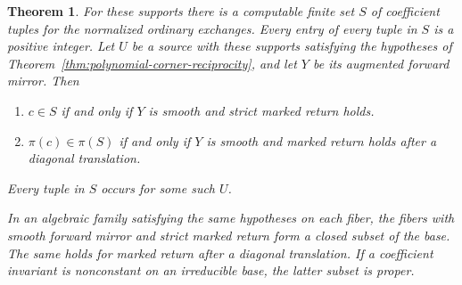 \documentclass[11pt,reqno]{amsart}
\numberwithin{equation}{section}
\newtheorem{theorem}{Theorem}[section]
\theoremstyle{definition}
\theoremstyle{remark}
\begin{document}
\begin{theorem}\label{thm:finite-return-coefficients}
For these supports there is a computable finite set \(S\) of
coefficient tuples for the normalized ordinary exchanges. Every entry
of every tuple in \(S\) is a positive integer.
Let \(U\) be a source with these supports satisfying the hypotheses of
Theorem~\ref{thm:polynomial-corner-reciprocity}, and let \(Y\) be its
augmented forward mirror. Then
\begin{enumerate}
\item \(c\in S\) if and only if \(Y\) is smooth and strict marked return holds.
\item \(\pi(c)\in\pi(S)\) if and only if \(Y\) is smooth and marked return
holds after a diagonal translation.
\end{enumerate}
Every tuple in \(S\) occurs for some such \(U\).

In an algebraic family satisfying the same hypotheses on each fiber,
the fibers with smooth forward mirror and strict marked return
form a closed subset of the base. The same holds for marked return
after a diagonal translation. If a coefficient invariant is
nonconstant on an irreducible base, the latter subset is proper.
\end{theorem}
\end{document}
